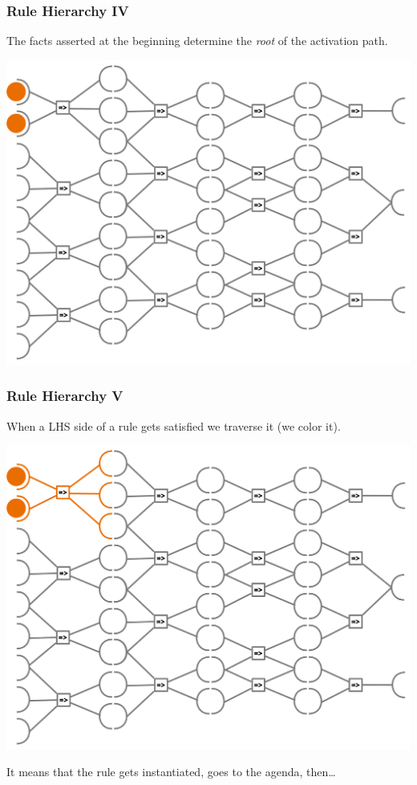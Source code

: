 \documentclass[xcolor={usenames,dvipsnames,svgnames}, compress]{beamer}
\begin{document}
\begin{frame}
  \frametitle{Rule Hierarchy IV}
  The facts asserted at the beginning determine the \emph{root} of the
  activation path.
  \begin{center}
    \includegraphics[width=0.7\linewidth]{Figures/rulesact-I}
  \end{center}
\end{frame}

\begin{frame}
  \frametitle{Rule Hierarchy V}
  When a LHS side of a rule gets satisfied we traverse it (we color
  it). 
  \begin{center}
    \includegraphics[width=0.7\linewidth]{Figures/rulesact-II}
  \end{center}
  It means that the rule
  gets instantiated, goes to the agenda, then\dots
\end{frame}
\end{document}

